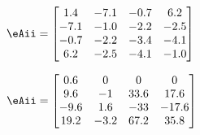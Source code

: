 \begin{exercise}
\begin{Parts}
\begin{OmitV1}
\item \(\eAii=\begin{bmatrix} 1.4 & -7.1 & -0.7 & 6.2
\\ -7.1 & -1.0 & -2.2 & -2.5
\\ -0.7 & -2.2 & -3.4 & -4.1
\\ 6.2 & -2.5 & -4.1 & -1.0 \end{bmatrix}\)
\setbox\ajrqrbox\hbox{\qrcode{%
[1.4 -7.1 -0.7 6.2
-7.1 -1.0 -2.2 -2.5
-0.7 -2.2 -3.4 -4.1
6.2 -2.5 -4.1 -1.0]
}}\marginajrbox%

\item \(\eAii=\begin{bmatrix} 0.6 & 0 & 0 & 0
\\9.6 & -1 & 33.6 & 17.6
\\-9.6 & 1.6 & -33 & -17.6
\\19.2 & -3.2 & 67.2 & 35.8 \end{bmatrix}\)
\setbox\ajrqrbox\hbox{\qrcode{%
[0.6 0 0 0
9.6 -1 33.6 17.6
-9.6 1.6 -33 -17.6
19.2 -3.2 67.2 35.8]
}}\marginajrbox%
\end{OmitV1}

\end{Parts}
\end{exercise}






